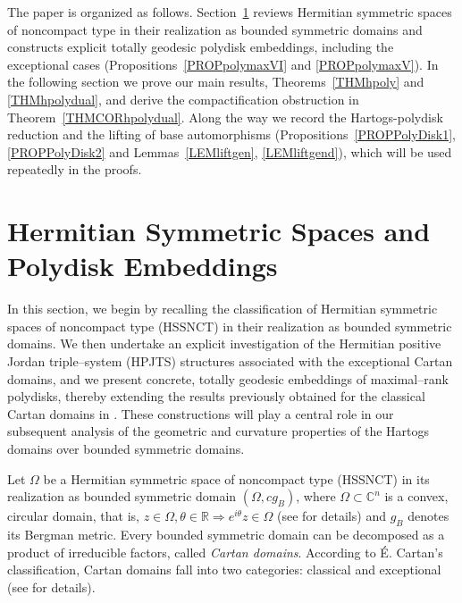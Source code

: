 \documentclass[reqno, 11pt]{amsart}
\begin{document}
The paper is organized as follows.
Section~\ref{SECcartan} reviews Hermitian symmetric spaces of noncompact type in their realization as bounded symmetric domains and constructs explicit totally geodesic polydisk embeddings, including the exceptional cases (Propositions~\ref{PROPpolymaxVI} and \ref{PROPpolymaxV}). In the following section we prove our main results, Theorems~\ref{THMhpoly} and \ref{THMhpolydual}, and derive the compactification obstruction in Theorem~\ref{THMCORhpolydual}. Along the way we record the Hartogs-polydisk reduction and the lifting of base automorphisms (Propositions~\ref{PROPPolyDisk1}, \ref{PROPPolyDisk2} and Lemmas~\ref{LEMliftgen}, \ref{LEMliftgend}), which will be used repeatedly in the proofs.



\section{Hermitian Symmetric Spaces  and Polydisk Embeddings}\label{SECcartan}
In this section, we begin by recalling the classification of Hermitian symmetric spaces of noncompact type (HSSNCT) in their realization as bounded symmetric domains.  We then undertake an explicit investigation of the Hermitian positive Jordan triple–system (HPJTS) structures associated with the exceptional Cartan domains, and we present concrete, totally geodesic embeddings of maximal–rank polydisks, thereby extending the results previously obtained for the classical Cartan domains in \cite{MOSSAZEDDA2022polch}.  These constructions will play a central role in our subsequent analysis of the geometric and curvature properties of the Hartogs domains over bounded symmetric domains.

\vskip 0.2cm

Let $\Omega$ be a Hermitian symmetric space of noncompact type (HSSNCT) in its realization as bounded symmetric domain \((\Omega, c g_B)\), where \(\Omega \subset \mathbb{C}^n\) is a convex, circular domain, that is, \(z \in \Omega, \theta \in \mathbb{R} \Rightarrow e^{i\theta} z \in \Omega\) (see \cite{KOBAYASHI1959GeomBounded} for details) and $g_B$ denotes its Bergman metric. Every bounded symmetric domain can be decomposed as a product of irreducible factors, called \emph{Cartan domains}. According to É. Cartan’s classification, Cartan domains fall into two categories: classical and exceptional (see \cite{KOBAYASHIbookHyperbMfd1970} for details).
\end{document}
